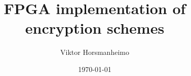 \documentclass[english,twoside,censored,tkt]{HYthesisML}
\title{FPGA implementation of encryption schemes}
\author{Viktor Horsmanheimo}
\date{\today}
\theoremstyle{definition}
\begin{document}
\maketitle




\mytableofcontents

\mainmatter






\printbibliography

\backmatter
\begin{appendices}


\end{appendices}
\end{document}
